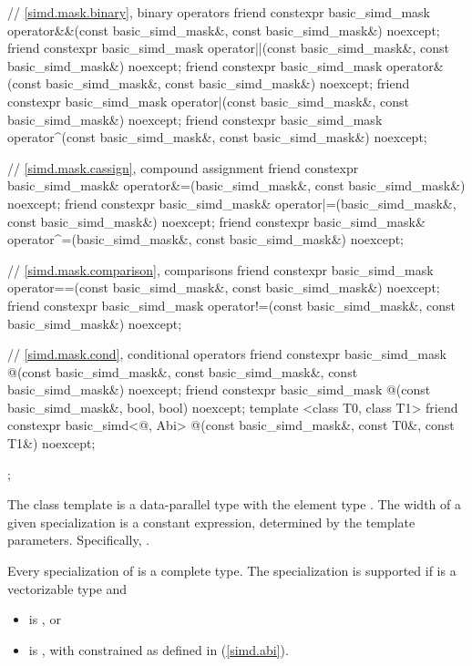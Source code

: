 \begin{codeblock}
{  // \ref{simd.mask.binary},  binary operators
  friend constexpr basic_simd_mask operator&&(const basic_simd_mask&, const basic_simd_mask&) noexcept;
  friend constexpr basic_simd_mask operator||(const basic_simd_mask&, const basic_simd_mask&) noexcept;
  friend constexpr basic_simd_mask operator&(const basic_simd_mask&, const basic_simd_mask&) noexcept;
  friend constexpr basic_simd_mask operator|(const basic_simd_mask&, const basic_simd_mask&) noexcept;
  friend constexpr basic_simd_mask operator^(const basic_simd_mask&, const basic_simd_mask&) noexcept;

  // \ref{simd.mask.cassign},  compound assignment
  friend constexpr basic_simd_mask& operator&=(basic_simd_mask&, const basic_simd_mask&) noexcept;
  friend constexpr basic_simd_mask& operator|=(basic_simd_mask&, const basic_simd_mask&) noexcept;
  friend constexpr basic_simd_mask& operator^=(basic_simd_mask&, const basic_simd_mask&) noexcept;

  // \ref{simd.mask.comparison},  comparisons
  friend constexpr basic_simd_mask operator==(const basic_simd_mask&, const basic_simd_mask&) noexcept;
  friend constexpr basic_simd_mask operator!=(const basic_simd_mask&, const basic_simd_mask&) noexcept;

  // \ref{simd.mask.cond},  conditional operators
  friend constexpr basic_simd_mask @\simdselect@(const basic_simd_mask&, const basic_simd_mask&, const basic_simd_mask&) noexcept;
  friend constexpr basic_simd_mask @\simdselect@(const basic_simd_mask&, bool, bool) noexcept;
  template <class T0, class T1>
    friend constexpr basic_simd<@\seebelow@, Abi>
      @\simdselect@(const basic_simd_mask&, const T0&, const T1&) noexcept;
};
\end{codeblock}

\pnum
The class template  is a data-parallel type with the element type . The width of a given  specialization is a constant expression, determined by the template parameters. Specifically, .

\pnum
Every specialization of  is a complete type. The specialization  is supported if  is a vectorizable type and
\begin{itemize}
  \item {} is , or
  \item {} is , with  constrained as defined in (\ref{simd.abi}).
\end{itemize}

